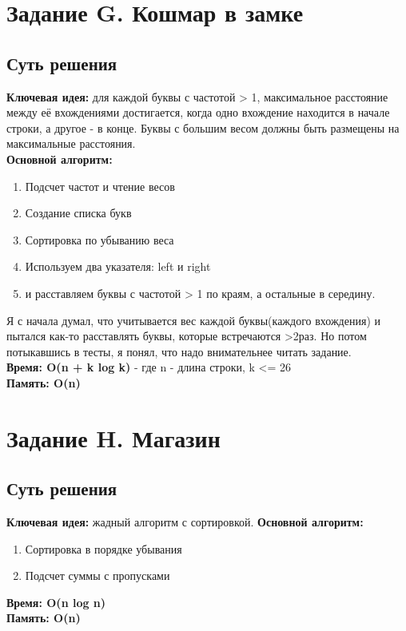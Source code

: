 \documentclass[a4paper,12pt]{article}
\begin{document}
    \newpage


    \section{Задание G. Кошмар в замке}

    

    \subsection*{Суть решения}
    \textbf{Ключевая идея:} для каждой буквы с частотой > 1, максимальное расстояние между её вхождениями достигается, когда одно вхождение находится в начале строки, а другое - в конце. Буквы с большим весом должны быть размещены на максимальные расстояния.\\

    \textbf{Основной алгоритм:}
    \begin{enumerate}
        \item Подсчет частот и чтение весов
        \item Создание списка букв
        \item Сортировка по убыванию веса
        \item Используем два указателя: left и right
        \item и расставляем буквы с частотой > 1 по краям, а остальные в середину.
    \end{enumerate}
    Я с начала думал, что учитывается вес каждой буквы(каждого вхождения) и пытался как-то расставлять буквы, которые встречаются >2раз.
    Но потом потыкавшись в тесты, я понял, что надо внимательнее читать задание.\\
    \textbf{Время: O(n + k log k)} - где n - длина строки, k <= 26\\
    \textbf{Память: O(n)}


    \newpage


    \section{Задание H. Магазин}

    

    \subsection*{Суть решения}
    \textbf{Ключевая идея:} жадный алгоритм с сортировкой.
    \textbf{Основной алгоритм:}
    \begin{enumerate}
        \item Сортировка в порядке убывания
        \item Подсчет суммы с пропусками
    \end{enumerate}
    \textbf{Время: O(n log n)}\\
    \textbf{Память: O(n)}
\end{document}

